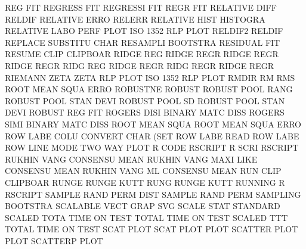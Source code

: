 REG                                     FIT
REGRESS                                 FIT
REGRESSI                                FIT
REGR                                    FIT
RELATIVE DIFF                           RELDIF
RELATIVE ERRO                           RELERR
RELATIVE HIST                           HISTOGRA
RELATIVE LABO PERF PLOT                 ISO      1352 RLP  PLOT
RELDIF2                                 RELDIF
REPLACE                                 SUBSTITU CHAR
RESAMPLI                                BOOTSTRA
RESIDUAL                                FIT
RESUME   CLIP                           CLIPBOAR
RIDGE    REG                            RIDGE    REGR
RIDGE    REGR                           RIDGE    REGR
RIDG     REG                            RIDGE    REGR
RIDG     REGR                           RIDGE    REGR
RIEMANN  ZETA                           ZETA
RLP      PLOT                           ISO      1352 RLP  PLOT
RMDIR                                   RM
RMS                                     ROOT     MEAN SQUA ERRO
ROBUSTNE                                ROBUST
ROBUST   POOL RANG                      ROBUST   POOL STAN DEVI
ROBUST   POOL SD                        ROBUST   POOL STAN DEVI
ROBUST   REG                            FIT
ROGERS   DISI                           BINARY   MATC DISS
ROGERS   SIMI                           BINARY   MATC DISS
ROOT     MEAN SQUA                      ROOT     MEAN SQUA ERRO
ROW      LABE COLU                      CONVERT  CHAR (SET
ROW      LABE                           READ     ROW  LABE
ROW      LINE MODE                      TWO      WAY  PLOT
R        CODE                           RSCRIPT
R        SCRI                           RSCRIPT
RUKHIN   VANG                           CONSENSU MEAN
RUKHIN   VANG MAXI LIKE                 CONSENSU MEAN
RUKHIN   VANG ML                        CONSENSU MEAN
RUN      CLIP                           CLIPBOAR
RUNGE                                   RUNGE    KUTT
RUNG                                    RUNGE    KUTT
RUNNING  R                              RSCRIPT
SAMPLE   RAND PERM DIST                 SAMPLE   RAND PERM
SAMPLING                                BOOTSTRA
SCALABLE VECT GRAP                      SVG
SCALE    STAT                           STANDARD
SCALED   TOTA TIME ON   TEST            TOTAL    TIME ON   TEST
SCALED   TTT                            TOTAL    TIME ON   TEST
SCAT                                    PLOT
SCAT     PLOT                           PLOT
SCATTER  PLOT                           PLOT
SCATTERP                                PLOT
